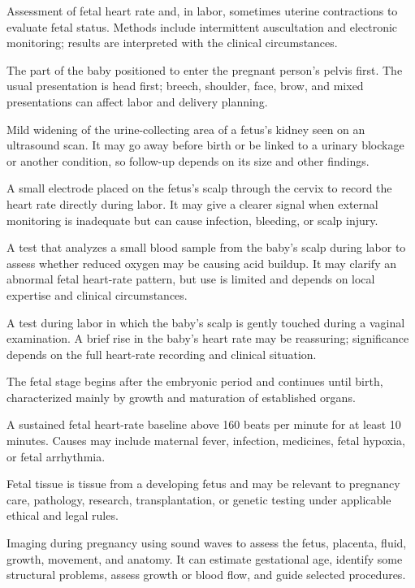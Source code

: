  Assessment of fetal heart rate and, in labor, sometimes uterine contractions to evaluate fetal status. Methods include intermittent auscultation and electronic monitoring; results are interpreted with the clinical circumstances.

 The part of the baby positioned to enter the pregnant person’s pelvis first. The usual presentation is head first; breech, shoulder, face, brow, and mixed presentations can affect labor and delivery planning.

 Mild widening of the urine-collecting area of a fetus’s kidney seen on an ultrasound scan. It may go away before birth or be linked to a urinary blockage or another condition, so follow-up depends on its size and other findings.

 A small electrode placed on the fetus’s scalp through the cervix to record the heart rate directly during labor. It may give a clearer signal when external monitoring is inadequate but can cause infection, bleeding, or scalp injury.

 A test that analyzes a small blood sample from the baby's scalp during labor to assess whether reduced oxygen may be causing acid buildup. It may clarify an abnormal fetal heart-rate pattern, but use is limited and depends on local expertise and clinical circumstances.

 A test during labor in which the baby’s scalp is gently touched during a vaginal examination. A brief rise in the baby’s heart rate may be reassuring; significance depends on the full heart-rate recording and clinical situation.

 The fetal stage begins after the embryonic period and continues until birth, characterized mainly by growth and maturation of established organs.

 A sustained fetal heart-rate baseline above 160 beats per minute for at least 10 minutes. Causes may include maternal fever, infection, medicines, fetal hypoxia, or fetal arrhythmia.

 Fetal tissue is tissue from a developing fetus and may be relevant to pregnancy care, pathology, research, transplantation, or genetic testing under applicable ethical and legal rules.

 Imaging during pregnancy using sound waves to assess the fetus, placenta, fluid, growth, movement, and anatomy. It can estimate gestational age, identify some structural problems, assess growth or blood flow, and guide selected procedures.

